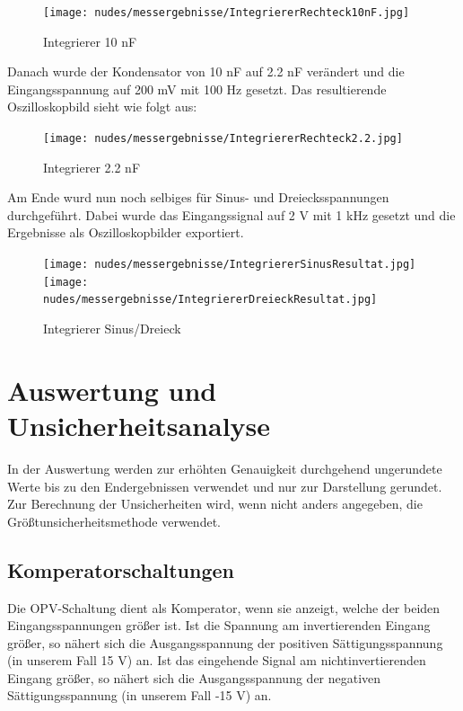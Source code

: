 \documentclass[12pt,a4paper,twoside]{article}
\begin{document}
\begin{figure}[H]
    \centering
    \texttt{[image: nudes/messergebnisse/IntegriererRechteck10nF.jpg]}
    \caption{Integrierer 10 nF}
    \label{fig:IntegriererResultat1}
\end{figure}

\noindent
Danach wurde der Kondensator von 10 nF auf 2.2 nF verändert und die Eingangsspannung auf 200 mV mit 100 Hz gesetzt. Das resultierende Oszilloskopbild sieht wie folgt aus:

\begin{figure}[H]
    \centering
    \texttt{[image: nudes/messergebnisse/IntegriererRechteck2.2.jpg]}
    \caption{Integrierer 2.2 nF}
    \label{fig:IntegriererResultat2}
\end{figure}

\noindent
Am Ende wurd nun noch selbiges für Sinus- und Dreiecksspannungen durchgeführt. Dabei wurde das Eingangssignal auf 2 V mit 1 kHz gesetzt und die Ergebnisse als Oszilloskopbilder exportiert.

\begin{figure}[H]
    \centering
    \texttt{[image: nudes/messergebnisse/IntegriererSinusResultat.jpg]}
    \texttt{[image: nudes/messergebnisse/IntegriererDreieckResultat.jpg]}
    \caption{Integrierer Sinus/Dreieck}
    \label{fig:IntegriererResultat3}
\end{figure}


\section{Auswertung und Unsicherheitsanalyse} %

In der Auswertung werden zur erhöhten Genauigkeit durchgehend ungerundete Werte bis zu den Endergebnissen verwendet und nur zur Darstellung gerundet. \\
Zur Berechnung der Unsicherheiten wird, wenn nicht anders angegeben, die Größtunsicherheitsmethode verwendet.

\subsection{Komperatorschaltungen}

Die OPV-Schaltung dient als Komperator, wenn sie anzeigt, welche der beiden Eingangsspannungen größer ist. Ist die Spannung am invertierenden Eingang größer, so nähert sich die Ausgangsspannung der positiven Sättigungsspannung (in unserem Fall 15 V) an. 
Ist das eingehende Signal am nichtinvertierenden Eingang größer, so nähert sich die Ausgangsspannung der negativen Sättigungsspannung (in unserem Fall -15 V) an. \newline
\end{document}
